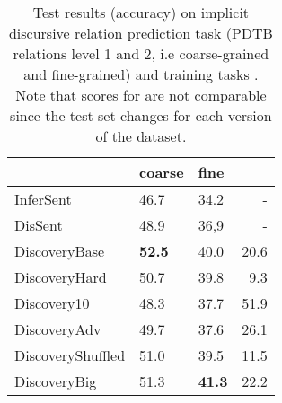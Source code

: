 \documentclass[11pt,a4paper]{article}
\begin{document}
 \begin{table}[htb]
\begin{small}
\begin{center}
\begin{tabular}{lp{1cm}p{1cm}r}
\toprule
{} &   coarse&   fine&    \\
\midrule
InferSent          &  46.7 &   34.2 &  - \\
DisSent & 48.9& 36,9 & - \\
DiscoveryBase         &  \textbf{52.5} &   40.0 &  20.6 \\
DiscoveryHard     &  50.7 &   39.8 &   9.3 \\
Discovery10       &  48.3 &   37.7 &  51.9 \\
DiscoveryAdv      &  49.7 &   37.6 &  26.1 \\
DiscoveryShuffled &  51.0 &   39.5 &  11.5 \\
DiscoveryBig      &  51.3 &   \textbf{41.3} &  22.2 \\
\bottomrule
\end{tabular}
\end{center}
\caption{Test results (accuracy) on implicit discursive relation prediction task (PDTB relations level 1 and 2, i.e coarse-grained and fine-grained) and training tasks . Note that scores for  are not comparable since the test set changes for each version of the dataset. }
\label{table:disctasks}
\end{small}
\end{table}
 
 
\end{document}
